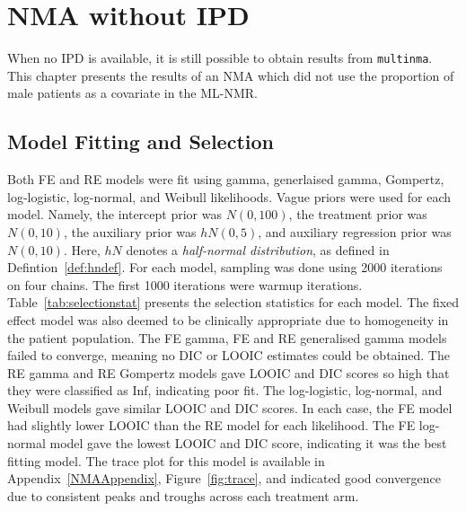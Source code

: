 \chapter{NMA without IPD}\label{noIPD}

When no IPD is available, it is still possible to obtain results from \verb|multinma|. This chapter presents the results of an NMA which did not use the proportion of male patients as a covariate in the ML-NMR.

\section{Model Fitting and Selection}
Both FE and RE models were fit using gamma, generlaised gamma, Gompertz, log-logistic, log-normal, and Weibull likelihoods. Vague priors were used for each model. Namely, the intercept prior was $N(0, 100)$, the treatment prior was $N(0, 10)$, the auxiliary prior was $hN(0, 5)$, and auxiliary regression prior was $N(0, 10)$. Here, $hN$ denotes a \textit{half-normal distribution}, as defined in Defintion~\ref{def:hndef}. For each model, sampling was done using 2000 iterations on four chains. The first 1000 iterations were warmup iterations. \\

Table~\ref{tab:selectionstat} presents the selection statistics for each model. The fixed effect model was also deemed to be clinically appropriate due to homogeneity in the patient population. The FE gamma, FE and RE generalised gamma models failed to converge, meaning no DIC or LOOIC estimates could be obtained. The RE gamma and RE Gompertz models gave LOOIC and DIC scores so high that they were classified as Inf, indicating poor fit. The log-logistic, log-normal, and Weibull models gave similar LOOIC and DIC scores. In each case, the FE model had slightly lower LOOIC than the RE model for each likelihood. The FE log-normal model gave the lowest LOOIC and DIC score, indicating it was the best fitting model. The trace plot for this model is available in Appendix~\ref{NMAAppendix}, Figure~\ref{fig:trace}, and indicated good convergence due to consistent peaks and troughs across each treatment arm. \\

